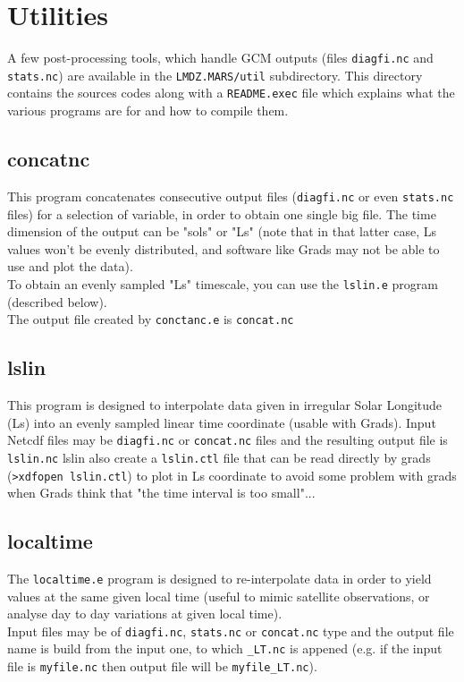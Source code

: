 \chapter{Utilities}

\label{sc:utilities}

A few post-processing tools, which handle GCM outputs (files
{\tt diagfi.nc} and {\tt stats.nc}) are available in the
{\tt LMDZ.MARS/util} subdirectory.
This directory contains the sources codes along with a {\tt README.exec}
file which explains what the various programs are for and
how to compile them.

\section{concatnc}
This program concatenates consecutive
output files ({\tt diagfi.nc} or even {\tt stats.nc} files) for a selection of 
variable, in order to obtain one single big file.
The time dimension of the output can
be "sols" or "Ls" (note that in that latter case, Ls values won't be
evenly distributed, and
software like Grads may not be able to use and plot the data).\\
To obtain an evenly sampled "Ls"
timescale, you can use the {\tt lslin.e} program (described below).\\
The output file created by {\tt conctanc.e} is {\tt concat.nc}

\section{lslin}

This program is designed to interpolate data given
in  irregular Solar Longitude (Ls) into an evenly sampled
linear time coordinate (usable with Grads).
Input Netcdf files may be {\tt diagfi.nc} or {\tt concat.nc}  
files and the resulting
output file is {\tt lslin.nc}
lslin also create a {\tt lslin.ctl} file that can be read
directly by grads (\verb+>xdfopen lslin.ctl+) to plot in Ls coordinate to
avoid some problem with grads when Grads think that "the time interval
is too small"...

\section{localtime}

The {\tt localtime.e} program is designed to re-interpolate data in order
to yield values at the same given local time (useful to mimic satellite
observations, or analyse day to day variations at given local time).\\
Input files may be of {\tt diagfi.nc}, {\tt stats.nc} or {\tt concat.nc}
type and the output file name is build from the input one, to which 
{\tt \_LT.nc} is appened (e.g. if the input file is {\tt myfile.nc} then
output file will be {\tt myfile\_LT.nc}).

